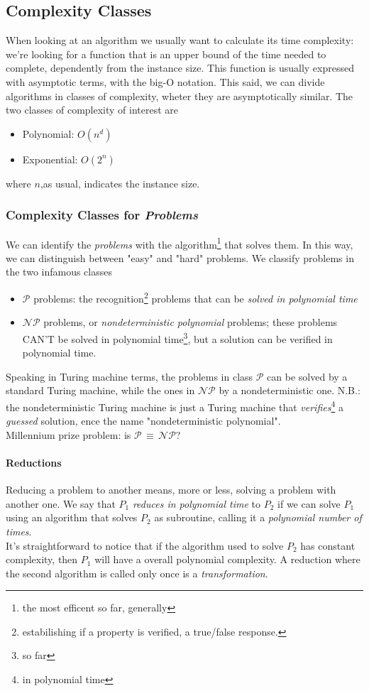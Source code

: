 \documentclass{article}
\begin{document}
		\subsection{Complexity Classes}
			When looking at an algorithm we usually want to calculate its time complexity: we're looking for a function that is an upper bound of the time needed to complete, dependently from the instance size. This function is usually expressed with asymptotic terms, with the big-O notation. This said, we can divide algorithms in classes of complexity, wheter they are asymptotically similar. The two classes of complexity of interest are
			\begin{itemize}
				\item Polynomial: $O(n^d)$
				\item Exponential: $O(2^n)$
			\end{itemize}
			where $n$,as usual, indicates the instance size.

			\subsubsection{Complexity Classes for \emph{Problems}}
				We can identify the \textit{problems} with the algorithm\footnote{the most efficent so far, generally} that solves them. In this way, we can distinguish between "easy" and "hard" problems. We classify problems in the two infamous classes
				\begin{itemize}
					\item $\mathcal{P}$ problems: the recognition\footnote{estabilishing if a property is verified, a true/false response.} problems that can be \textit{solved in polynomial time}
					\item $\mathcal{NP}$ problems, or \textit{nondeterministic polynomial} problems; these problems CAN'T be solved in polynomial time\footnote{so far}, but a solution can be verified in polynomial time.
				\end{itemize}
				Speaking in Turing machine terms, the problems in class $\mathcal{P}$ can be solved by a standard Turing machine, while the ones in $\mathcal{NP}$ by a nondeterministic one. N.B.: the nondeterministic Turing machine is just a Turing machine that \textit{verifies}\footnote{in polynomial time} a \textit{guessed} solution, ence the name "nondeterministic polynomial".\\
				Millennium prize problem: is $\mathcal{P} \,\equiv\, \mathcal{NP}$?

				\paragraph{Reductions}
					Reducing a problem to another means, more or less, solving a problem with another one. We say that $P_1$ \textit{reduces in polynomial time} to $P_2$ if we can solve $P_1$ using an algorithm that solves $P_2$ as subroutine, calling it a \textit{polynomial number of times}.\\
					It's straightforward to notice that if the algorithm used to solve $P_2$ has constant complexity, then $P_1$ will have a overall polynomial complexity. A reduction where the second algorithm is called only once is a \textit{transformation}.
\end{document}
